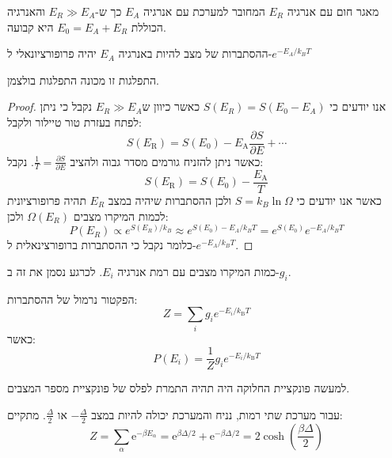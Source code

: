 \documentclass{tstextbook}
\begin{document}
\begin{definition}
מאגר חום עם אנרגיה \(E_{R}\) המחובר למערכת עם אנרגיה \(E_{A}\) כך ש-\(E_{R}\gg E_{A}\) והאנרגיה הכוללת \(E_{0}=E_{A}+E_{R}\) היא קבועה.

\end{definition}
\begin{proposition}
ההסתברות של מצב להיות באנרגיה \(E_{A}\) יהיה פרופורציונאלי ל-\(e^{ -E_{A}/k_{B}T }\)

\end{proposition}
\begin{remark}
התפלגות זו מכונה התפלגות בולצמן.

\end{remark}
\begin{proof}
אנו יודעים כי \(S(E_{R})=S(E_{0}-E_{A})\) כאשר כיוון ש\(E_{R}\gg E_{A}\) נקבל כי ניתן לפתח בעזרת טור טיילור ולקבל:
$$S(E_{\mathrm{R}})=S(E_{0})-E_{\mathrm{A}}\frac{\partial S}{\partial E}+\cdots$$
כאשר ניתן להזניח גורמים מסדר גבוה ולהציב \(\frac{1}{T}=\frac{\partial S}{\partial E}\). נקבל:
$$S(E_{\mathrm{R}})=S(E_{0})-{\frac{E_{\mathrm{A}}}{T}}$$
כאשר אנו יודעים כי \(S=k_{B}\ln \Omega\) ולכן ההסתברות שיהיה במצב \(E_{R}\) תהיה פרופורציונית לכמות המיקרו מצבים \(\Omega(E_{R})\) ולכן:
$$P(E_{R})\propto e^{S(E_R)/k_{B}}\approx e^{S(E_{0})-E_{A}/k_{B}T}=e^{ S(E_{0}) }e^{ -E_{A}/k_{B}T }$$
כלומר נקבל כי ההסתברות ברופורצינאלית ל-\(e^{ -E_{A}/k_{B}T }\).

\end{proof}
\begin{definition}[ניוון]
כמות המיקרו מצבים עם רמת אנרגיה \(E_{i}\). לכרגע נסמן את זה ב-\(g_{i}\).

\end{definition}
\begin{definition}
הפקטור נרמול של ההסתברות:
$$Z=\sum_{i}g_{i}e^{-E_{i}/k_{\mathrm{{B}}}T}$$
כאשר:
$$ P(E_{i})={\frac{1}{Z}}g_{i}e^{-E_{i}/k_{\mathrm{B}}T}$$

\end{definition}
\begin{remark}
למעשה פונקציית החלוקה היה תהיה התמרת לפלס של פונקציית מספר המצבים.

\end{remark}
\begin{example}
עבור מערכת שתי רמות, נניח והמערכת יכולה להיות במצב \(-\frac{\Delta}{2}\) או \(\frac{\Delta}{2}\). מתקיים:
$$Z=\sum_{\alpha}\mathrm{e}^{-\beta E_{\alpha}}=\mathrm{e}^{\beta\Delta/2}+\mathrm{e}^{-\beta\Delta/2}=2\cosh\left({\frac{\beta\Delta}{2}}\right)$$

\end{example}
\end{document}
